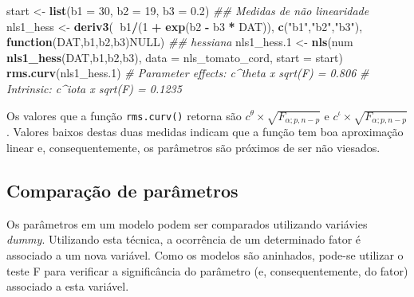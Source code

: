 \documentclass[
]{book}
\newenvironment{Shaded}{\begin{snugshade}}{\end{snugshade}}
\newcommand{\CommentTok}[1]{\textcolor[rgb]{0.56,0.35,0.01}{\textit{#1}}}
\newcommand{\ControlFlowTok}[1]{\textcolor[rgb]{0.13,0.29,0.53}{\textbf{#1}}}
\newcommand{\DataTypeTok}[1]{\textcolor[rgb]{0.13,0.29,0.53}{#1}}
\newcommand{\DecValTok}[1]{\textcolor[rgb]{0.00,0.00,0.81}{#1}}
\newcommand{\FloatTok}[1]{\textcolor[rgb]{0.00,0.00,0.81}{#1}}
\newcommand{\KeywordTok}[1]{\textcolor[rgb]{0.13,0.29,0.53}{\textbf{#1}}}
\newcommand{\NormalTok}[1]{#1}
\newcommand{\OperatorTok}[1]{\textcolor[rgb]{0.81,0.36,0.00}{\textbf{#1}}}
\newcommand{\OtherTok}[1]{\textcolor[rgb]{0.56,0.35,0.01}{#1}}
\newcommand{\StringTok}[1]{\textcolor[rgb]{0.31,0.60,0.02}{#1}}
\begin{document}
\begin{Shaded}
\begin{Highlighting}[]

\NormalTok{start <-}\StringTok{ }\KeywordTok{list}\NormalTok{(}\DataTypeTok{b1 =} \DecValTok{30}\NormalTok{, }\DataTypeTok{b2 =} \DecValTok{19}\NormalTok{, }\DataTypeTok{b3 =} \FloatTok{0.2}\NormalTok{)}
\CommentTok{## Medidas de não linearidade}
\NormalTok{nls1_hess <-}\StringTok{ }\KeywordTok{deriv3}\NormalTok{(}\OperatorTok{~}\NormalTok{b1}\OperatorTok{/}\NormalTok{(}\DecValTok{1} \OperatorTok{+}\StringTok{ }\KeywordTok{exp}\NormalTok{(b2 }\OperatorTok{-}\StringTok{ }\NormalTok{b3 }\OperatorTok{*}\StringTok{ }\NormalTok{DAT)), }\KeywordTok{c}\NormalTok{(}\StringTok{"b1"}\NormalTok{,}\StringTok{"b2"}\NormalTok{,}\StringTok{"b3"}\NormalTok{),}
                   \ControlFlowTok{function}\NormalTok{(DAT,b1,b2,b3)}\OtherTok{NULL}\NormalTok{) }\CommentTok{## hessiana}
\NormalTok{nls1_hess}\FloatTok{.1}\NormalTok{ <-}\StringTok{ }\KeywordTok{nls}\NormalTok{(num }\OperatorTok{~}\StringTok{ }\KeywordTok{nls1_hess}\NormalTok{(DAT,b1,b2,b3),}
                   \DataTypeTok{data =}\NormalTok{ nls_tomato_cord,}
                   \DataTypeTok{start =}\NormalTok{ start)}
\KeywordTok{rms.curv}\NormalTok{(nls1_hess}\FloatTok{.1}\NormalTok{)}
\CommentTok{# Parameter effects: c^theta x sqrt(F) = 0.806 }
\CommentTok{#         Intrinsic: c^iota  x sqrt(F) = 0.1235}
\end{Highlighting}
\end{Shaded}

Os valores que a função \texttt{rms.curv()} retorna são \({c^\theta } \times \sqrt {{F_{\alpha ;p,n - p}}}\) e \({c^\iota } \times \sqrt {{F_{\alpha ;p,n - p}}}\). Valores baixos destas duas medidas indicam que a função tem boa aproximação linear e, consequentemente, os parâmetros são próximos de ser não viesados.

\hypertarget{comparauxe7uxe3o-de-paruxe2metros}{%
\subsection{Comparação de parâmetros}\label{comparauxe7uxe3o-de-paruxe2metros}}

Os parâmetros em um modelo podem ser comparados utilizando variávies \emph{dummy}. Utilizando esta técnica, a ocorrência de um determinado fator é associado a um nova variável. Como os modelos são aninhados, pode-se utilizar o teste F para verificar a significância do parâmetro (e, consequentemente, do fator) associado a esta variável.
\end{document}
